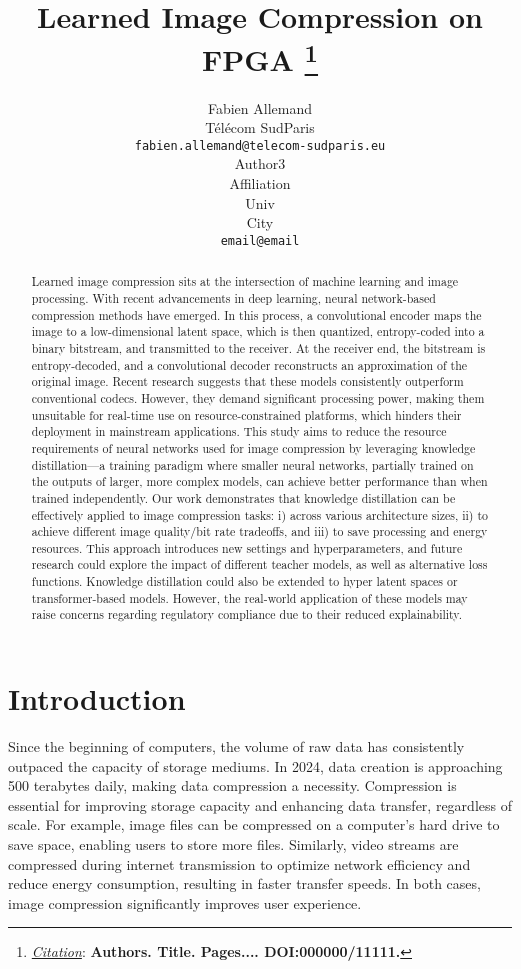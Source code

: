 \documentclass{article}
\title{Learned Image Compression on FPGA
\thanks{\textit{\underline{Citation}}: 
\textbf{Authors. Title. Pages.... DOI:000000/11111.}} 
}
\author{
  Fabien Allemand\\
  Télécom SudParis\\
  \texttt{fabien.allemand@telecom-sudparis.eu} \\
   \And
  Author3 \\
  Affiliation \\
  Univ \\
  City\\
  \texttt{email@email} \\
}
\begin{document}
\maketitle


\begin{abstract}
  Learned image compression sits at the intersection of machine learning and image processing. With recent advancements in deep learning, neural network-based compression methods have emerged. In this process, a convolutional encoder maps the image to a low-dimensional latent space, which is then quantized, entropy-coded into a binary bitstream, and transmitted to the receiver. At the receiver end, the bitstream is entropy-decoded, and a convolutional decoder reconstructs an approximation of the original image. Recent research suggests that these models consistently outperform conventional codecs. However, they demand significant processing power, making them unsuitable for real-time use on resource-constrained platforms, which hinders their deployment in mainstream applications. This study aims to reduce the resource requirements of neural networks used for image compression by leveraging knowledge distillation—a training paradigm where smaller neural networks, partially trained on the outputs of larger, more complex models, can achieve better performance than when trained independently. Our work demonstrates that knowledge distillation can be effectively applied to image compression tasks: i) across various architecture sizes, ii) to achieve different image quality/bit rate tradeoffs, and iii) to save processing and energy resources. This approach introduces new settings and hyperparameters, and future research could explore the impact of different teacher models, as well as alternative loss functions. Knowledge distillation could also be extended to hyper latent spaces or transformer-based models. However, the real-world application of these models may raise concerns regarding regulatory compliance due to their reduced explainability.
\end{abstract}




\section{Introduction}
Since the beginning of computers, the volume of raw data has consistently outpaced the capacity of storage mediums. In 2024, data creation is approaching 500 terabytes daily, making data compression a necessity. Compression is essential for improving storage capacity and enhancing data transfer, regardless of scale. For example, image files can be compressed on a computer's hard drive to save space, enabling users to store more files. Similarly, video streams are compressed during internet transmission to optimize network efficiency and reduce energy consumption, resulting in faster transfer speeds. In both cases, image compression significantly improves user experience.
\end{document}
